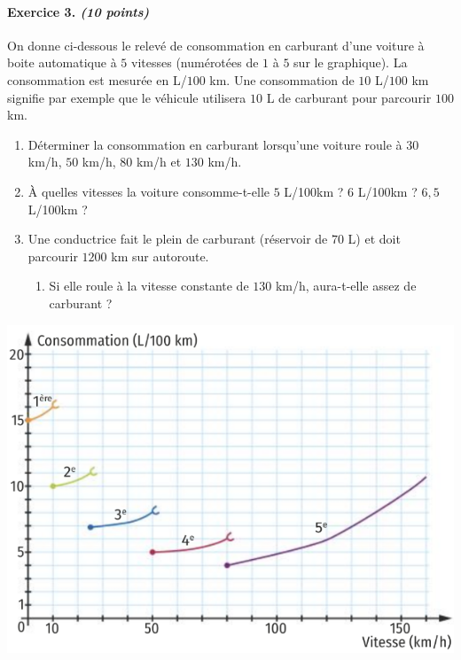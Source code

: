\documentclass[11pt]{article}
\begin{document}
\paragraph{Exercice 3. \emph{(10 points)}} On donne ci-dessous le relevé de consommation en
carburant d'une voiture à boite automatique à $5$ vitesses (numérotées de $1$ à
$5$ sur le graphique). La consommation est mesurée en L/$100$ km. Une
consommation de $10$ L/$100$ km signifie par exemple que le véhicule utilisera $10$ L de
carburant pour parcourir $100$ km.\\
\begin{minipage}{.48\textwidth}
  \begin{enumerate}[leftmargin=*]
    \item Déterminer la consommation en carburant lorsqu'une voiture roule à
      $30$ km/h, $50$ km/h, $80$ km/h et $130$ km/h.
    \item À quelles vitesses la voiture consomme-t-elle $5$ L/100km ? $6$
      L/100km ? $6,5$ L/100km ?
    \item Une conductrice fait le plein de carburant (réservoir de $70$ L) et
      doit parcourir $1200$ km sur autoroute.
      \begin{enumerate}%
        \item Si elle roule à la vitesse constante de $130$ km/h, aura-t-elle
          assez de carburant ?
      \end{enumerate}
  \end{enumerate}
\end{minipage}
\hfill
\begin{minipage}{.5\textwidth}
  \begin{center}
    \includegraphics[scale=.4]{vitesses.png}
  \end{center}
\end{minipage}
\end{document}
